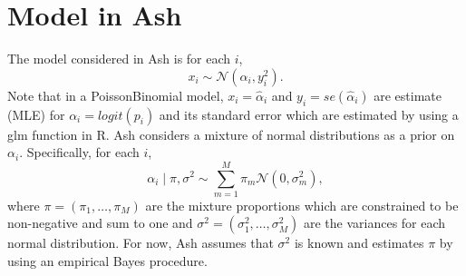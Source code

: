 \documentclass[12pt,letterpaper]{article}
\newcommand{\given}{\mid}
\newcommand{\Normal}{\mathcal{N}}
\begin{document}


\section{Model in Ash}
\label{sec:Model_Ash}
The model considered in Ash is for each $i$,
\begin{equation}
x_i \sim \Normal(\alpha_i, y_i^2).
\end{equation}
Note that in a PoissonBinomial model, $x_i = \hat{\alpha}_i$ and $y_i = se(\hat{\alpha}_i)$ are estimate (MLE) for $\alpha_i = logit(p_i)$ and its standard error which are estimated by using a glm function in R. 
Ash considers a mixture of normal distributions as a prior on $\alpha_i$. Specifically, for each $i$, 
\begin{equation}
\alpha_i \given \pi, \sigma^2 \sim \sum_{m=1}^M \pi_m\Normal(0, \sigma^2_m),\label{eqn:ash_prior}
\end{equation}
where $\pi = (\pi_1, \ldots, \pi_M)$ are the mixture proportions which are constrained to be non-negative and sum to one and $\sigma^2 = (\sigma^2_1, \ldots, \sigma^2_M)$ are the variances for each normal distribution. For now, Ash assumes that $\sigma^2$ is known and estimates $\pi$ by using an empirical Bayes procedure. 
\end{document}
